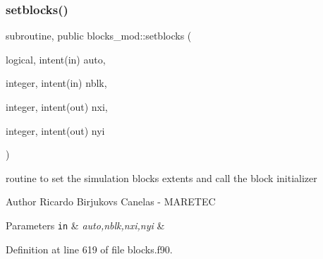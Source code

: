 \subsubsection{\texorpdfstring{setblocks()}{setblocks()}}
{\footnotesize\ttfamily subroutine, public blocks\+\_\+mod\+::setblocks (\begin{DoxyParamCaption}\item[{logical, intent(in)}]{auto,  }\item[{integer, intent(in)}]{nblk,  }\item[{integer, intent(out)}]{nxi,  }\item[{integer, intent(out)}]{nyi }\end{DoxyParamCaption})}



routine to set the simulation blocks extents and call the block initializer 

\begin{DoxyAuthor}{Author}
Ricardo Birjukovs Canelas -\/ M\+A\+R\+E\+T\+EC 
\end{DoxyAuthor}

\begin{DoxyParams}[1]{Parameters}
\mbox{\tt in}  & {\em auto,nblk,nxi,nyi} & \\
\hline
\end{DoxyParams}


Definition at line 619 of file blocks.\+f90.


